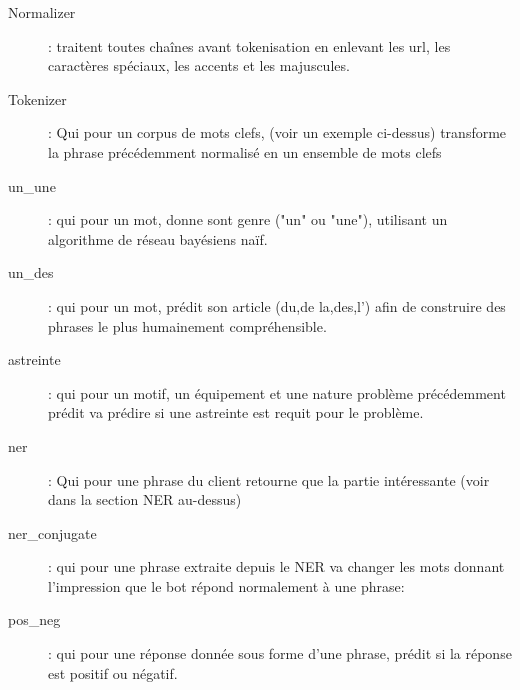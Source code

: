 \begin{description}
\item[Normalizer]: traitent toutes chaînes avant tokenisation en enlevant les url, les caractères spéciaux, les accents et les majuscules.
\item[Tokenizer]: Qui pour un corpus de mots clefs, (voir un exemple ci-dessus) transforme la phrase précédemment normalisé en un ensemble de mots clefs
\item[un\_une]: qui pour un mot, donne sont genre ("un" ou "une"), utilisant un algorithme de réseau bayésiens naïf.
\item[un\_des]: qui pour un mot, prédit son article (du,de la,des,l') afin de construire des phrases le plus humainement compréhensible.
\item[astreinte]: qui pour un motif, un équipement et une nature problème précédemment prédit va prédire si une astreinte est requit pour le problème.
\item[ner]: Qui pour une phrase du client retourne que la partie intéressante (voir dans la section NER au-dessus)
\item[ner\_conjugate]: qui pour une phrase extraite depuis le NER va changer les mots donnant l’impression que le bot répond normalement à une phrase:
\item[pos\_neg]: qui pour une réponse donnée sous forme d'une phrase, prédit si la réponse est positif ou négatif.
\end{description}

